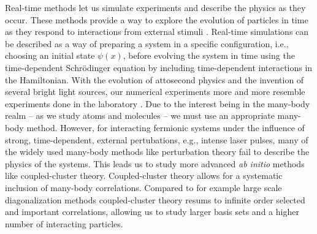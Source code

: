     Real-time methods let us simulate experiments and describe the physics as
    they occur.
    These methods provide a way to explore the evolution of particles in time as
    they respond to interactions from external stimuli \cite{joshua-magnus}.
    Real-time simulations can be described as a way of preparing a system in a
    specific configuration, i.e., choosing an initial state $\psi(x)$, before
    evolving the system in time using the time-dependent Schrödinger equation by
    including time-dependent interactions in the Hamiltonian.
    With the evolution of attosecond physics and the invention of several bright
    light sources, our numerical experiments more and more resemble experiments
    done in the laboratory \cite{joachain2012atoms}.
    Due to the interest being in the many-body realm -- as we study atoms and
    molecules -- we must use an appropriate many-body method.
    However, for interacting fermionic systems under the influence of strong,
    time-dependent, external pertubations, e.g., intense laser pulses, many of
    the widely used many-body methods like perturbation theory fail to describe
    the physics of the systems.
    This leads us to study more advanced \emph{ab initio} methods like
    coupled-cluster theory.
    Coupled-cluster theory allows for a systematic inclusion of many-body
    correlations.
    Compared to for example large scale diagonalization methods coupled-cluster
    theory resums to infinite order selected and important correlations,
    allowing us to study larger basis sets and a higher number of interacting
    particles.


